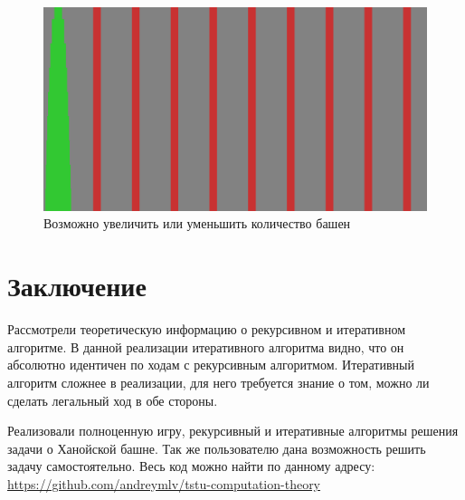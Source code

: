 \begin{figure}[H]
	\begin{center}
		\includegraphics[width=\textwidth]{images/many_towers.png}
		\caption{Возможно увеличить или уменьшить количество башен}
	\end{center}
\end{figure}

\section*{Заключение}
Рассмотрели теоретическую информацию о рекурсивном и итеративном алгоритме. В
данной реализации итеративного алгоритма видно, что он абсолютно идентичен по
ходам с рекурсивным алгоритмом. Итеративный алгоритм сложнее в реализации, для
него требуется знание о том, можно ли сделать легальный ход в обе стороны.

Реализовали полноценную игру, рекурсивный и итеративные алгоритмы решения
задачи о Ханойской башне. Так же пользователю дана возможность решить задачу
самостоятельно. Весь код можно найти по данному адресу:
\url{https://github.com/andreymlv/tstu-computation-theory}
